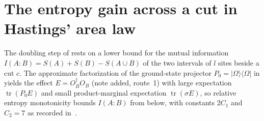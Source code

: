 \section{The entropy gain across a cut in Hastings' area law}
\label{sec:hastings_relent}


The doubling step of \cite{Hastings2007AreaLaw} rests on a lower bound for the
mutual information $I(A:B)=S(A)+S(B)-S(A\cup B)$ of the two intervals of $l$
sites beside a cut $c$. The approximate factorization of the ground-state
projector $P_0=|\Omega\rangle\langle\Omega|$ in
\cite[Lemma~1]{Hastings2007AreaLaw} yields the effect $E=O_B^\dagger O_B$
(note added, route~1) with large expectation $\operatorname{tr}(P_0 E)$ and
small product-marginal expectation $\operatorname{tr}(\sigma E)$, so relative
entropy monotonicity bounds $I(A:B)$ from below, with constants $2C_1$ and
$C_2=7$ as recorded in~\cite{gap:hastings07_relent_constants}.

